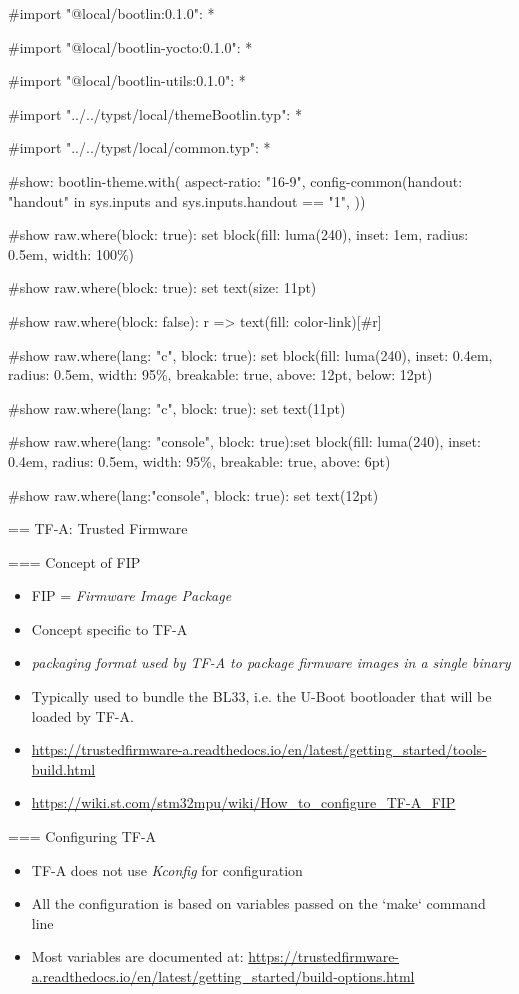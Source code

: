 #import "@local/bootlin:0.1.0": *

#import "@local/bootlin-yocto:0.1.0": *

#import "@local/bootlin-utils:0.1.0": *

#import "../../typst/local/themeBootlin.typ": *

#import "../../typst/local/common.typ": *

#show: bootlin-theme.with( aspect-ratio: "16-9", config-common(handout: "handout" in sys.inputs and sys.inputs.handout == "1", ))

#show raw.where(block: true): set block(fill: luma(240), inset: 1em, radius: 0.5em, width: 100\%)

#show raw.where(block: true): set text(size: 11pt)

#show raw.where(block: false): r => text(fill: color-link)[#r]

#show raw.where(lang: "c", block: true): set block(fill: luma(240), inset: 0.4em, radius: 0.5em, width: 95\%, breakable: true, above: 12pt, below: 12pt)

#show raw.where(lang: "c", block: true): set text(11pt)

#show raw.where(lang: "console", block: true):set block(fill: luma(240), inset: 0.4em, radius: 0.5em, width: 95\%, breakable: true, above: 6pt)

#show raw.where(lang:"console", block: true): set text(12pt)

 == TF-A: Trusted Firmware

=== {Concept of FIP}
  \begin{itemize}
  \item FIP = {\em Firmware Image Package}
  \item Concept specific to TF-A
  \item {\em packaging format used by TF-A to package firmware images
      in a single binary}
  \item Typically used to bundle the BL33, i.e. the U-Boot bootloader
    that will be loaded by TF-A.
  \item \url{https://trustedfirmware-a.readthedocs.io/en/latest/getting_started/tools-build.html}
  \item \url{https://wiki.st.com/stm32mpu/wiki/How_to_configure_TF-A_FIP}
  \end{itemize}


=== {Configuring TF-A}
  \begin{itemize}
  \item TF-A does not use {\em Kconfig} for configuration
  \item All the configuration is based on variables passed on the
    `make` command line
  \item Most variables are documented at:
    \url{https://trustedfirmware-a.readthedocs.io/en/latest/getting_started/build-options.html}
  \end{itemize}


